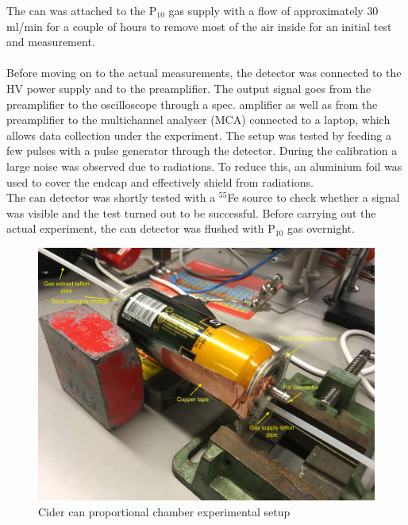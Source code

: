 The can was attached to the P$_{10}$ gas supply with a flow of approximately $30$ ml/min for a couple of hours to remove most of the air inside for an initial test and measurement. \\ \\
Before moving on to the actual measurements, the detector was connected to the HV power supply and to the preamplifier. The output signal goes from the preamplifier to the oscilloscope through a spec. amplifier as well as from the preamplifier to the multichannel analyser (MCA) connected to a laptop, which allows data collection under the experiment. The setup was tested by feeding a few pulses with a pulse generator through the detector. During the calibration a large noise was observed due to radiations. To reduce this, an aluminium foil was used to cover the endcap and effectively shield from radiations. \\
The can detector was shortly tested with a $^{55}$Fe source to check whether a signal was visible and the test turned out to be successful. Before carrying out the actual experiment, the can detector was flushed with P$_{10}$ gas overnight.

\begin{figure}[h!]
	\centering
	\includegraphics[width=\textwidth]{./graphics/BeerCanSetup.JPG}
	\caption{Cider can proportional chamber experimental setup}
	\label{fig:BeerCan}
\end{figure}

